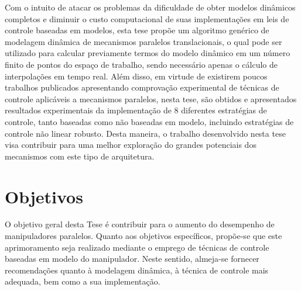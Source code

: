 \documentclass[]{politex}
\begin{document}
Com o intuito de atacar os problemas da dificuldade de obter modelos dinâmicos completos e diminuir o custo computacional de suas implementações em leis de controle baseadas em modelos, esta tese propõe um algoritmo genérico de modelagem dinâmica de mecanismos paralelos translacionais, o qual pode ser utilizado para calcular previamente termos do modelo dinâmico em um número finito de pontos do espaço de trabalho, sendo necessário apenas o cálculo de interpolações em tempo real.  Além disso, em virtude de existirem poucos  trabalhos publicados apresentando comprovação experimental de técnicas de controle aplicáveis a mecanismos paralelos, nesta tese, são obtidos e apresentados resultados experimentais da implementação de 8 diferentes estratégias de controle, tanto baseadas como não baseadas em modelo, incluindo estratégias de controle não linear robusto. Desta maneira, o trabalho desenvolvido nesta tese visa contribuir para uma melhor exploração do grandes potenciais dos mecanismos com este tipo de arquitetura.


    

\section{Objetivos}\label{objetivos}

O objetivo geral desta Tese é contribuir para o aumento do desempenho de manipuladores paralelos. Quanto aos objetivos específicos, propõe-se que este aprimoramento seja realizado mediante o emprego de técnicas de controle baseadas em modelo do manipulador. Neste sentido, almeja-se fornecer recomendações quanto à modelagem dinâmica, à técnica de controle mais adequada, bem como a sua implementação.
\end{document}
